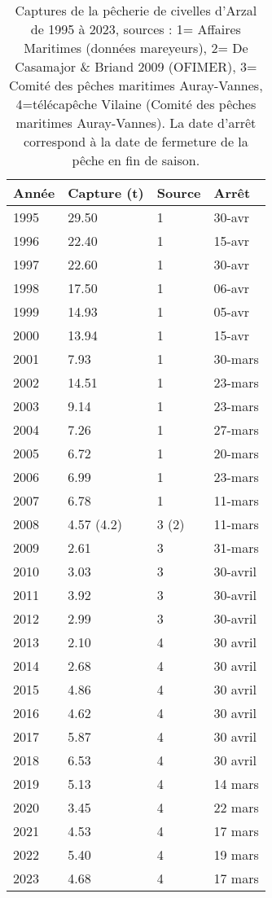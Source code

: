 \documentclass[10pt,twocolumn,titlepage,twoside]{article}\usepackage[]{graphicx}\usepackage[]{color}
\begin{document}
\begin{table}[htpb]
\centering
\caption{Captures de la pêcherie de civelles d'Arzal de 1995 à 2023, sources : 
1= Affaires Maritimes (données mareyeurs), 
2= De Casamajor \& Briand 2009 (OFIMER),
3= Comité des pêches maritimes Auray-Vannes,
4=télécapêche Vilaine (Comité des pêches maritimes Auray-Vannes). 
La date d'arrêt correspond à la date de fermeture de la pêche en fin de saison.}
\label{tableau_captures}
\begin{tabular}{llll}
\toprule
Année & Capture (t) & Source & Arrêt \\ 
\midrule
1995  & 29.50  &  1 & 30-avr \\
1996  & 22.40  &  1 & 15-avr \\
1997  & 22.60  &  1 & 30-avr \\
1998  & 17.50  &  1 & 06-avr \\
1999  & 14.93  &  1 & 05-avr \\
2000  & 13.94  &  1 & 15-avr \\
2001  & 7.93   &  1 & 30-mars \\
2002  & 14.51  &  1 & 23-mars \\
2003  & 9.14 &  1   & 23-mars \\
2004  & 7.26 &  1  & 27-mars \\
2005  & 6.72 &  1  & 20-mars \\
2006  & 6.99 &  1  & 23-mars \\
2007  & 6.78 &  1  & 11-mars \\
2008  & 4.57 (4.2) & 3 (2) & 11-mars\\
2009  & 2.61 & 3  & 31-mars \\
2010  & 3.03 & 3 & 30-avril \\
2011  & 3.92 & 3  & 30-avril \\
2012  & 2.99 & 3  & 30-avril \\
2013  & 2.10 & 4  & 30 avril \\
2014  & 2.68 & 4  & 30 avril \\
2015  & 4.86 & 4  & 30 avril \\
2016  & 4.62 & 4 &  30 avril\\  %
2017  & 5.87 & 4  & 30 avril \\ 
2018 & 6.53 &  4  & 30 avril \\ 
2019 & 5.13 &  4  &  14 mars\\ 
2020 & 3.45 &  4  &  22 mars \\ 
2021 & 4.53 &  4  &  17 mars \\
2022  & 5.40 & 4 & 19 mars \\ 
2023  & 4.68 & 4 & 17 mars \\
\bottomrule
\end{tabular}
\end{table}
\normalsize
\end{document}
